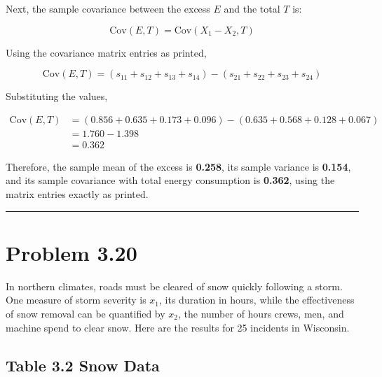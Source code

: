 \documentclass[12pt]{article}
\begin{document}
\vspace{0.2cm}

Next, the sample covariance between the excess $E$ and the total $T$ is:

\vspace{0.2cm}

\[
\text{Cov}(E, T) = \text{Cov}(X_1 - X_2, T)
\]

\vspace{0.2cm}

Using the covariance matrix entries as printed,

\vspace{0.2cm}

\[
\text{Cov}(E, T) = (s_{11} + s_{12} + s_{13} + s_{14}) - (s_{21} + s_{22} + s_{23} + s_{24})
\]

\vspace{0.2cm}

Substituting the values,

\vspace{0.2cm}

\begin{align*}
\text{Cov}(E, T) &= (0.856 + 0.635 + 0.173 + 0.096) - (0.635 + 0.568 + 0.128 + 0.067) \\
&= 1.760 - 1.398 \\
&= \boxed{0.362}
\end{align*}

\vspace{0.2cm}

Therefore, the sample mean of the excess is \textbf{0.258}, its sample variance is \textbf{0.154}, and its sample covariance with total energy consumption is \textbf{0.362}, using the matrix entries exactly as printed.

\vspace{0.7cm}
\hrule
\vspace{0.7cm}

\section*{Problem 3.20}

In northern climates, roads must be cleared of snow quickly following a storm. One measure of storm severity is $x_1$, its duration in hours, while the effectiveness of snow removal can be quantified by $x_2$, the number of hours crews, men, and machine spend to clear snow. Here are the results for 25 incidents in Wisconsin.

\subsection*{Table 3.2 Snow Data}
\end{document}
